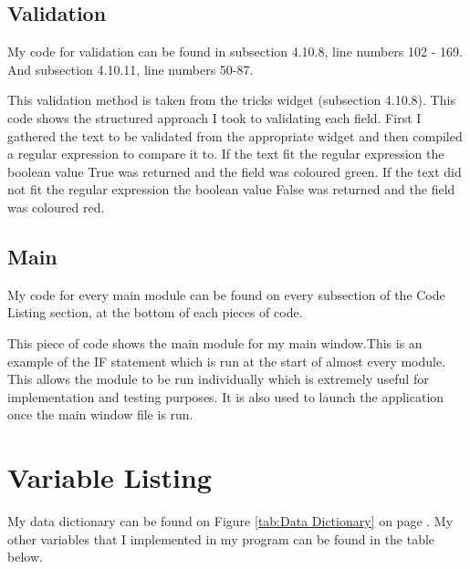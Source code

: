 \begin{landscape}
\subsection{Validation}

My code for validation can be found in subsection 4.10.8, line numbers 102 - 169. And subsection 4.10.11, line numbers 50-87.


This validation method is taken from the tricks widget (subsection 4.10.8). This code shows the structured approach I took to validating each field. First I gathered the text to be validated from the appropriate widget and then compiled a regular expression to compare it to. If the text fit the regular expression the boolean value True was returned and the field was coloured green. If the text did not fit the regular expression the boolean value False was returned and the field was coloured red.


\subsection{Main}

My code for every main module can be found on every subsection of the Code Listing section, at the bottom of each pieces of code.


This piece of code shows the main module for my main window.This is an example of the IF statement which is run at the start of almost every module. This allows the module to be run individually which is extremely useful for implementation and testing purposes. It is also used to launch the application once the main window file is run.


\end{landscape}






\section{Variable Listing}

My data dictionary can be found on Figure \ref{tab:Data Dictionary} on page \pageref{tab:Data Dictionary}. My other variables that I implemented in my program can be found in the table below.

